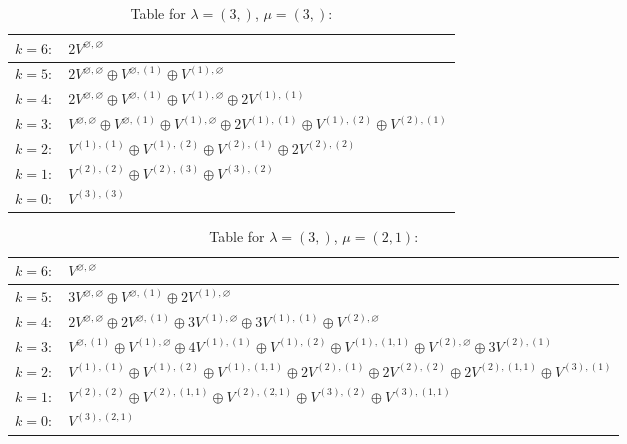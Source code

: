 \documentclass[a4paper,12pt]{article}
\begin{document}
\renewcommand{\arraystretch}{1.6} 
\begin{table}[H]
\centering
\caption{Table for $\lambda = (3,)$, $\mu = (3,)$:}
\begin{tabular}{|>{\centering\arraybackslash}p{15cm}|}
\hline
 $k = 6: \quad 2 V^{\varnothing, \varnothing} $ \\ \hline
 $k = 5: \quad 2 V^{\varnothing, \varnothing} \oplus V^{\varnothing, (1)} \oplus V^{(1), \varnothing} $ \\ \hline
 $k = 4: \quad 2 V^{\varnothing, \varnothing} \oplus V^{\varnothing, (1)} \oplus V^{(1), \varnothing} \oplus 2 V^{(1), (1)} $ \\ \hline
 $k = 3: \quad V^{\varnothing, \varnothing} \oplus V^{\varnothing, (1)} \oplus V^{(1), \varnothing} \oplus 2 V^{(1), (1)} \oplus V^{(1), (2)} \oplus V^{(2), (1)} $ \\ \hline
 $k = 2: \quad V^{(1), (1)} \oplus V^{(1), (2)} \oplus V^{(2), (1)} \oplus 2 V^{(2), (2)} $ \\ \hline
 $k = 1: \quad V^{(2), (2)} \oplus V^{(2), (3)} \oplus V^{(3), (2)} $ \\ \hline
 $k = 0: \quad V^{(3), (3)} $ \\ \hline
\end{tabular}
\end{table}

\renewcommand{\arraystretch}{1.6} 
\begin{table}[H]
\centering
\caption{Table for $\lambda = (3,)$, $\mu = (2, 1)$:}
\begin{tabular}{|>{\centering\arraybackslash}p{15cm}|}
\hline
 $k = 6: \quad V^{\varnothing, \varnothing} $ \\ \hline
 $k = 5: \quad 3 V^{\varnothing, \varnothing} \oplus V^{\varnothing, (1)} \oplus 2 V^{(1), \varnothing} $ \\ \hline
 $k = 4: \quad 2 V^{\varnothing, \varnothing} \oplus 2 V^{\varnothing, (1)} \oplus 3 V^{(1), \varnothing} \oplus 3 V^{(1), (1)} \oplus V^{(2), \varnothing} $ \\ \hline
 $k = 3: \quad V^{\varnothing, (1)} \oplus V^{(1), \varnothing} \oplus 4 V^{(1), (1)} \oplus V^{(1), (2)} \oplus V^{(1), (1, 1)} \oplus V^{(2), \varnothing} \oplus 3 V^{(2), (1)} $ \\ \hline
 $k = 2: \quad V^{(1), (1)} \oplus V^{(1), (2)} \oplus V^{(1), (1, 1)} \oplus 2 V^{(2), (1)} \oplus 2 V^{(2), (2)} \oplus 2 V^{(2), (1, 1)} \oplus V^{(3), (1)} $ \\ \hline
 $k = 1: \quad V^{(2), (2)} \oplus V^{(2), (1, 1)} \oplus V^{(2), (2, 1)} \oplus V^{(3), (2)} \oplus V^{(3), (1, 1)} $ \\ \hline
 $k = 0: \quad V^{(3), (2, 1)} $ \\ \hline
\end{tabular}
\end{table}
\end{document}
